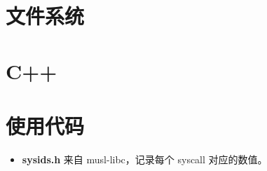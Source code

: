 \chapter{文件系统}
\label{chap:fs}


\chapter{C++}
\label{chap:why_cpp}


\chapter{使用代码}
\label{chap:3rdparty}
\begin{itemize}
\item \textbf{sysids.h} 来自 musl-libc，记录每个 syscall 对应的数值。
\end{itemize}





